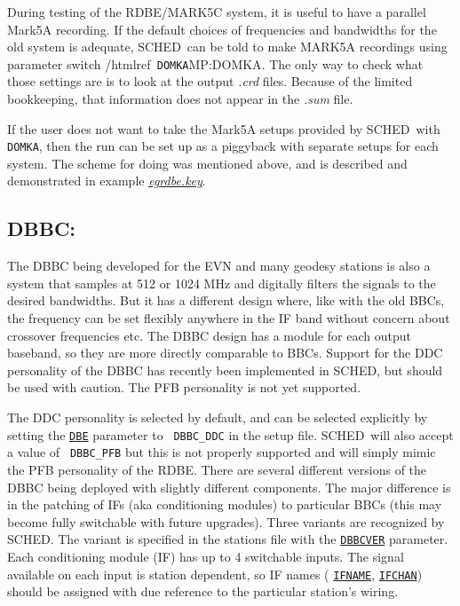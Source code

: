 \documentclass{report}
\newcommand{\sched}{{\sc SCHED}}
\newcommand{\schedb}{{\sc SCHED~}}
\begin{document}
During testing of the RDBE/MARK5C system, it is useful to have a
parallel Mark5A recording.  If the default choices of frequencies and
bandwidths for the old system is adequate, \schedb can be told to make
MARK5A recordings using parameter switch /htmlref{{\tt
DOMKA}}{MP:DOMKA}.  The only way to check what those settings are is
to look at the output {\sl .crd} files.  Because of the limited 
bookkeeping, that information does not appear in the {\sl .sum} file.

If the user does not want to take the Mark5A setups provided by
\schedb with {\tt DOMKA}, then the run can be set up as a piggyback
with separate setups for each system.  The scheme for doing was 
mentioned above, and is described and demonstrated in example
{\href{examples/egrdbe.key}{{\sl egrdbe.key}}}.


\subsection{\label{SSEC:DBBC}DBBC:}

The DBBC being developed for the EVN and many geodesy stations is also a
system that samples at 512 or 1024 MHz and digitally filters the signals
to the desired bandwidths. But it has a different design where, like
with the old BBCs, the frequency can be set flexibly anywhere in the IF
band without concern about crossover frequencies etc.  The DBBC design
has a module for each output baseband, so they are more directly
comparable to BBCs. Support for the DDC personality of the DBBC has
recently been implemented in \sched, but should be used with caution.
The PFB personality is not yet supported.

The DDC personality is selected by default, and can be selected
explicitly by setting the 
{\hyperref[SP:DBE]{{\tt DBE}}} parameter to {\tt
DBBC\_DDC} in the setup file. \schedb will also accept a value of {\tt
DBBC\_PFB} but this is not properly supported and will simply mimic the
PFB personality of the RDBE. There are several different versions of the
DBBC being deployed with slightly different components. The major
difference is in the patching of IFs (aka conditioning modules) to
particular BBCs (this may become fully switchable with future upgrades).
Three variants are recognized by \sched. The variant is specified in the
stations file with the 
{\hyperref[ST:DBBCVER]{{\tt DBBCVER}}} parameter.
Each conditioning module (IF) has up to 4 switchable inputs. The signal
available on each input is station dependent, so IF names (
{\hyperref[FQ:IFNAME]{{\tt IFNAME}}}, 
{\hyperref[SP:IFCHAN]{{\tt IFCHAN}}}) should be
assigned with due reference to the particular station's wiring.
\end{document}
